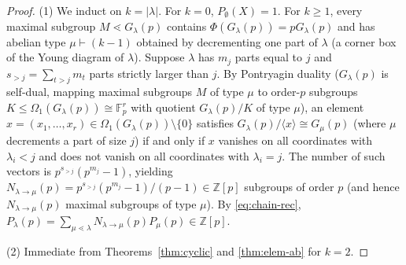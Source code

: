 \documentclass[11pt,a4paper]{article}
\theoremstyle{definition}
\newcommand{\Fp}{\mathbb{F}_p}
\begin{document}
\begin{proof}
(1) We induct on $k = |\lambda|$. For $k = 0$, $P_\emptyset(X) = 1$. For $k \ge 1$, every maximal subgroup $M \lessdot G_\lambda(p)$ contains $\Phi(G_\lambda(p)) = p G_\lambda(p)$ and has abelian type $\mu \vdash (k - 1)$ obtained by decrementing one part of $\lambda$ (a corner box of the Young diagram of $\lambda$). Suppose $\lambda$ has $m_j$ parts equal to $j$ and $s_{>j} = \sum_{t > j} m_t$ parts strictly larger than $j$. By Pontryagin duality ($G_\lambda(p)$ is self-dual, mapping maximal subgroups $M$ of type $\mu$ to order-$p$ subgroups $K \le \Omega_1(G_\lambda(p)) \cong \Fp^r$ with quotient $G_\lambda(p)/K$ of type $\mu$), an element $x = (x_1, \dots, x_r) \in \Omega_1(G_\lambda(p)) \setminus \{0\}$ satisfies $G_\lambda(p)/\langle x \rangle \cong G_\mu(p)$ (where $\mu$ decrements a part of size $j$) if and only if $x$ vanishes on all coordinates with $\lambda_i < j$ and does not vanish on all coordinates with $\lambda_i = j$. The number of such vectors is $p^{s_{>j}}(p^{m_j} - 1)$, yielding $N_{\lambda \to \mu}(p) = p^{s_{>j}}(p^{m_j} - 1)/(p - 1) \in \mathbb{Z}[p]$ subgroups of order $p$ (and hence $N_{\lambda \to \mu}(p)$ maximal subgroups of type $\mu$). By \eqref{eq:chain-rec}, $P_\lambda(p) = \sum_{\mu \lessdot \lambda} N_{\lambda \to \mu}(p) P_\mu(p) \in \mathbb{Z}[p]$.

(2) Immediate from Theorems~\ref{thm:cyclic} and \ref{thm:elem-ab} for $k = 2$.


\end{proof}
\end{document}
